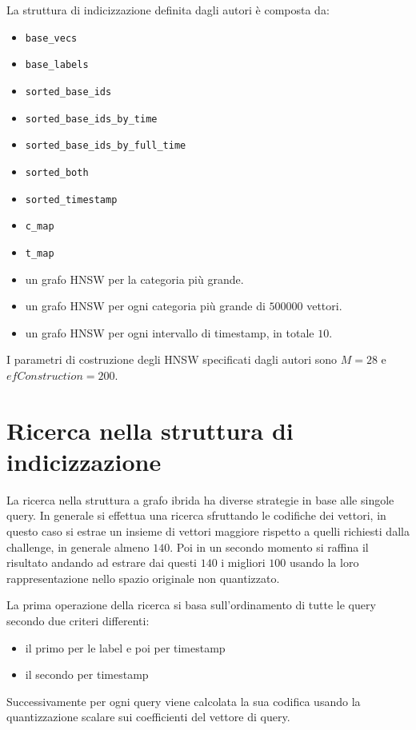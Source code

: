 La struttura di indicizzazione definita dagli autori è composta da:
\begin{itemize}
    \item \texttt{base\_vecs}
    \item \texttt{base\_labels}
    \item \texttt{sorted\_base\_ids}
    \item \texttt{sorted\_base\_ids\_by\_time} 
    \item \texttt{sorted\_base\_ids\_by\_full\_time}
    \item \texttt{sorted\_both}
    \item \texttt{sorted\_timestamp}
    \item \texttt{c\_map}
    \item \texttt{t\_map}
    \item un grafo HNSW per la categoria più grande.
    \item un grafo HNSW per ogni categoria più grande di $500000$ vettori.
    \item un grafo HNSW per ogni intervallo di timestamp, in totale $10$.
\end{itemize}

I parametri di costruzione degli HNSW specificati dagli autori sono $M = 28$ e 
$efConstruction = 200$.


\section{Ricerca nella struttura di indicizzazione}

La ricerca nella struttura a grafo ibrida ha diverse strategie in base alle singole 
query. In generale si effettua una ricerca sfruttando le codifiche dei vettori, 
in questo caso si estrae un insieme di vettori maggiore rispetto a quelli richiesti 
dalla challenge, in generale almeno $140$. Poi in un secondo momento si raffina 
il risultato andando ad estrare dai questi $140$ i migliori $100$ usando la loro 
rappresentazione nello spazio originale non quantizzato. 

La prima operazione della ricerca si basa sull'ordinamento di tutte le query 
secondo due criteri differenti:
\begin{itemize}
    \item il primo per le label e poi per timestamp
    \item il secondo per timestamp
\end{itemize} 
Successivamente per ogni query viene calcolata la sua codifica usando la quantizzazione 
scalare sui coefficienti del vettore di query.

